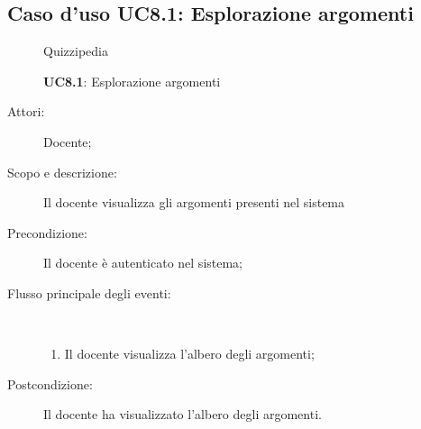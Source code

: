 \subsection{Caso d'uso UC8.1: Esplorazione argomenti}
	\begin{figure}[H]
		\centering
		\begin{resizedtikzpicture}{\textwidth}
		\begin{umlsystem}[x=0, fill=lightgray!20]{Quizzipedia}
		\end{umlsystem}
		\end{resizedtikzpicture}
		\caption{\textbf{UC8.1}: Esplorazione argomenti}
		\label{UC8.1}
	\end{figure}
\begin{description}
\item[Attori:] Docente;
\item[Scopo e descrizione:] Il docente visualizza gli argomenti presenti nel sistema
      \item[Precondizione:] Il docente è autenticato nel sistema;

        \item[Flusso principale degli eventi:] \ 
 \begin{enumerate}
          \item Il docente visualizza l'albero degli argomenti;

      \end{enumerate}
    \item[Postcondizione:] Il docente ha visualizzato l'albero degli argomenti.
  \end{description}
\hypertarget{UC8.2}{}
